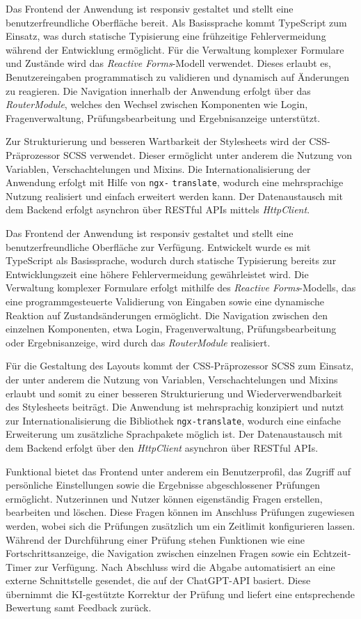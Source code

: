 \documentclass[a4paper,12pt]{article}
\begin{document}
Das Frontend der Anwendung ist responsiv gestaltet und stellt eine benutzerfreundliche Oberfläche bereit. Als Basissprache kommt TypeScript zum Einsatz, was durch statische Typisierung eine frühzeitige Fehlervermeidung während der Entwicklung ermöglicht. Für die Verwaltung komplexer Formulare und Zustände wird das \textit{Reactive Forms}-Modell verwendet. Dieses erlaubt es, Benutzereingaben programmatisch zu validieren und dynamisch auf Änderungen zu reagieren. Die Navigation innerhalb der Anwendung erfolgt über das \textit{RouterModule}, welches den Wechsel zwischen Komponenten wie Login, Fragenverwaltung, Prüfungsbearbeitung und Ergebnisanzeige unterstützt.

Zur Strukturierung und besseren Wartbarkeit der Stylesheets wird der CSS-Präprozessor SCSS verwendet. Dieser ermöglicht unter anderem die Nutzung von Variablen, Verschachtelungen und Mixins. Die Internationalisierung der Anwendung erfolgt mit Hilfe von \texttt{ngx-} \texttt{translate}, wodurch eine mehrsprachige Nutzung realisiert und einfach erweitert werden kann. Der Datenaustausch mit dem Backend erfolgt asynchron über RESTful APIs mittels \textit{HttpClient}.

Das Frontend der Anwendung ist responsiv gestaltet und stellt eine benutzerfreundliche Oberfläche zur Verfügung. Entwickelt wurde es mit TypeScript als Basissprache, wodurch durch statische Typisierung bereits zur Entwicklungszeit eine höhere Fehlervermeidung gewährleistet wird. Die Verwaltung komplexer Formulare erfolgt mithilfe des \textit{Reactive Forms}-Modells, das eine programmgesteuerte Validierung von Eingaben sowie eine dynamische Reaktion auf Zustandsänderungen ermöglicht. Die Navigation zwischen den einzelnen Komponenten, etwa Login, Fragenverwaltung, Prüfungsbearbeitung oder Ergebnisanzeige, wird durch das \textit{RouterModule} realisiert.

Für die Gestaltung des Layouts kommt der CSS-Präprozessor SCSS zum Einsatz, der unter anderem die Nutzung von Variablen, Verschachtelungen und Mixins erlaubt und somit zu einer besseren Strukturierung und Wiederverwendbarkeit des Stylesheets beiträgt. Die Anwendung ist mehrsprachig konzipiert und nutzt zur Internationalisierung die Bibliothek \texttt{ngx-translate}, wodurch eine einfache Erweiterung um zusätzliche Sprachpakete möglich ist. Der Datenaustausch mit dem Backend erfolgt über den \textit{HttpClient} asynchron über RESTful APIs.

Funktional bietet das Frontend unter anderem ein Benutzerprofil, das Zugriff auf persönliche Einstellungen sowie die Ergebnisse abgeschlossener Prüfungen ermöglicht. Nutzerinnen und Nutzer können eigenständig Fragen erstellen, bearbeiten und löschen. Diese Fragen können im Anschluss Prüfungen zugewiesen werden, wobei sich die Prüfungen zusätzlich um ein Zeitlimit konfigurieren lassen. Während der Durchführung einer Prüfung stehen Funktionen wie eine Fortschrittsanzeige, die Navigation zwischen einzelnen Fragen sowie ein Echtzeit-Timer zur Verfügung. Nach Abschluss wird die Abgabe automatisiert an eine externe Schnittstelle gesendet, die auf der ChatGPT-API basiert. Diese übernimmt die KI-gestützte Korrektur der Prüfung und liefert eine entsprechende Bewertung samt Feedback zurück.
\end{document}
